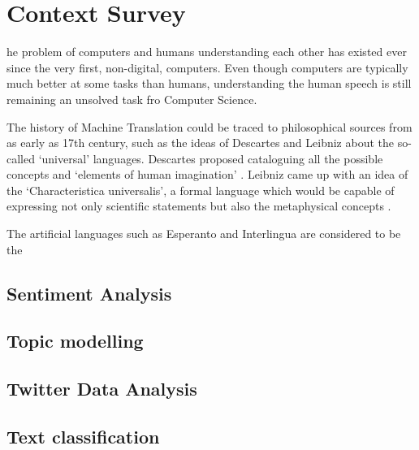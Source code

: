 \let\textcircled=\pgftextcircled
\chapter{Context Survey}
\label{chap:context-survey}

he problem of computers and humans understanding each other has existed ever since the very first, non-digital, computers. Even though computers are typically much better at some tasks than humans, understanding the human speech is still remaining an unsolved task fro Computer Science. 

The history of Machine Translation could be traced to philosophical sources from as early as 17th century, such as the ideas of Descartes and Leibniz about the so-called `universal' languages. Descartes proposed cataloguing all the possible concepts and `elements of human imagination' \cite{descartes}. Leibniz came up with an idea of the `Characteristica universalis', a formal language which would be capable of expressing not only scientific statements but also the metaphysical concepts \cite{leibniz}. 

The artificial languages such as Esperanto and Interlingua are considered to be the 


\section{Sentiment Analysis}
\label{sec:sentiment_analysis}

\section{Topic modelling}
\label{sec:topic_modelling}

\section{Twitter Data Analysis}
\label{sec:twitter_analysis}

\section{Text classification}
\label{sec:text_classification}

 
 